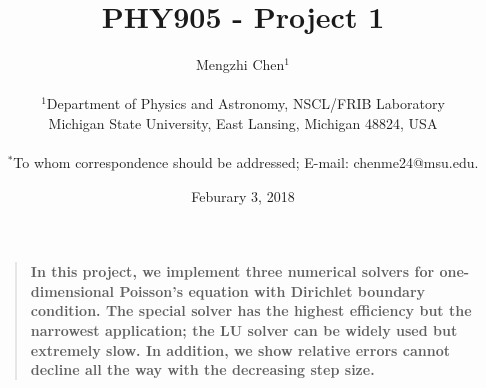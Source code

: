 \documentclass[12pt]{article}
\title{PHY905 - Project 1}
\author
{Mengzhi Chen$^{1}$\\
\\
\normalsize{$^{1}$Department of Physics and Astronomy, NSCL/FRIB Laboratory}\\
\normalsize{Michigan State University, East Lansing, Michigan 48824, USA}\\
\\
\normalsize{$^\ast$To whom correspondence should be addressed; E-mail:  chenme24@msu.edu.}
}
\date{Feburary 3, 2018}
\newenvironment{sciabstract}{%
\begin{quote} \bf}
{\end{quote}}
\begin{document}
 


\renewcommand{\figurename}{Fig.}
\renewcommand{\tablename}{Tab.}

\setlength{\parskip}{1ex}


\baselineskip18pt


\maketitle 





\begin{sciabstract}
  In this project, we implement three numerical solvers for one-dimensional Poisson's equation with Dirichlet boundary condition. The special solver has the highest efficiency but the narrowest application; the LU solver can be widely used but extremely slow. In addition, we show relative errors cannot decline all the way with the decreasing step size. 
\end{sciabstract}



\end{document}

